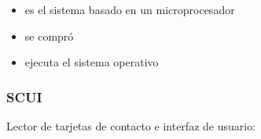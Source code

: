 \documentclass{beamer}
\begin{document}
\begin{frame}
	\begin{itemize}
		\item es el sistema basado en un microprocesador

		\bigskip
		\item se compró

		\bigskip
		\item ejecuta el sistema operativo
	\end{itemize}
\end{frame}

\begin{frame}
	\frametitle{SCUI}
	Lector de tarjetas de contacto e interfaz de usuario:
	\begin{figure}
		\subfigure{ 
}
\end{figure}
\end{frame}
\end{document}
